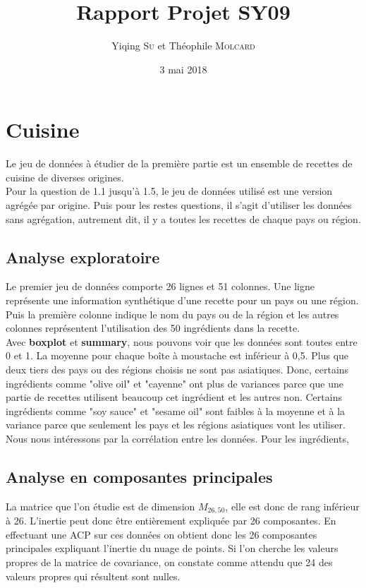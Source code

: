 \documentclass[a4paper, titlepage]{report}
\title{Rapport Projet SY09}
\date{3 mai 2018}
\author{Yiqing \textsc{Su} et Théophile \textsc{Molcard}}
\begin{document}
\renewcommand{\chaptername}{Partie}


\maketitle

\tableofcontents



\chapter{Cuisine}

Le jeu de données à étudier de la première partie est un ensemble de recettes de cuisine de diverses origines.\\
\indent Pour la question de 1.1 jusqu'à 1.5, le jeu de données utilisé est une version agrégée par origine. Puis pour les restes questions, il s'agit d'utiliser les données sans agrégation, autrement dit, il y a toutes les recettes de chaque pays ou région.

\section{Analyse exploratoire}
Le premier jeu de données comporte 26 lignes et 51 colonnes. Une ligne représente une information synthétique d'une recette pour un pays ou une région. Puis la première colonne indique le nom du pays ou de la région et les autres colonnes représentent l'utilisation des 50 ingrédients dans la recette.\\
\indent Avec \textbf{boxplot} et \textbf{summary}, nous pouvons voir que les données sont toutes entre 0 et 1. La moyenne pour chaque boîte à moustache est inférieur à 0,5. Plus que deux tiers des pays ou des régions choisis ne sont pas asiatiques. Donc, certains ingrédients comme "olive oil" et "cayenne" ont plus de variances parce que une partie de recettes utilisent beaucoup cet ingrédient et les autres non. Certains ingrédients comme "soy sauce" et "sesame oil" sont faibles à la moyenne et à la variance parce que seulement les pays et les régions asiatiques vont les utiliser.
\indent Nous nous intéressons par la corrélation entre les données. Pour les ingrédients, 

\section{Analyse en composantes principales}
La matrice que l'on étudie est de dimension $M_{26,50}$, elle est donc de rang inférieur à 26. L'inertie peut donc être entièrement expliquée par 26 composantes. En effectuant une ACP sur ces données on obtient donc les 26 composantes principales expliquant l'inertie du nuage de points. Si l'on cherche les valeurs propres de la matrice de covariance, on constate comme attendu que 24 des valeurs propres qui résultent sont nulles.\\
\end{document}
